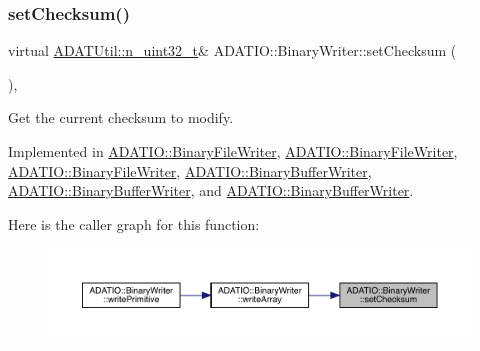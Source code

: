 \mbox{\label{classADATIO_1_1BinaryWriter_ae64230370824192d1f0dbcaa8e74017a}} 
\subsubsection{\texorpdfstring{setChecksum()}{setChecksum()}\hspace{0.1cm}{\footnotesize\ttfamily [1/3]}}
{\footnotesize\ttfamily virtual \mbox{\hyperlink{namespaceADATUtil_ad945a8afa4db2d1f89b731964adae97e}{A\+D\+A\+T\+Util\+::n\+\_\+uint32\+\_\+t}}\& A\+D\+A\+T\+I\+O\+::\+Binary\+Writer\+::set\+Checksum (\begin{DoxyParamCaption}{ }\end{DoxyParamCaption})\hspace{0.3cm}{\ttfamily [protected]}, {}}



Get the current checksum to modify. 



Implemented in \mbox{\hyperlink{classADATIO_1_1BinaryFileWriter_a0137ec5926d08e49ed7a63c6ef33e882}{A\+D\+A\+T\+I\+O\+::\+Binary\+File\+Writer}}, \mbox{\hyperlink{classADATIO_1_1BinaryFileWriter_a0137ec5926d08e49ed7a63c6ef33e882}{A\+D\+A\+T\+I\+O\+::\+Binary\+File\+Writer}}, \mbox{\hyperlink{classADATIO_1_1BinaryFileWriter_a0137ec5926d08e49ed7a63c6ef33e882}{A\+D\+A\+T\+I\+O\+::\+Binary\+File\+Writer}}, \mbox{\hyperlink{classADATIO_1_1BinaryBufferWriter_af4cc523a862ce29a96f1a813f254360e}{A\+D\+A\+T\+I\+O\+::\+Binary\+Buffer\+Writer}}, \mbox{\hyperlink{classADATIO_1_1BinaryBufferWriter_af4cc523a862ce29a96f1a813f254360e}{A\+D\+A\+T\+I\+O\+::\+Binary\+Buffer\+Writer}}, and \mbox{\hyperlink{classADATIO_1_1BinaryBufferWriter_af4cc523a862ce29a96f1a813f254360e}{A\+D\+A\+T\+I\+O\+::\+Binary\+Buffer\+Writer}}.

Here is the caller graph for this function\+:
\nopagebreak
\begin{figure}[H]
\begin{center}
\leavevmode
\includegraphics[width=350pt]{db/dee/classADATIO_1_1BinaryWriter_ae64230370824192d1f0dbcaa8e74017a_icgraph}
\end{center}
\end{figure}
\mbox{\label{classADATIO_1_1BinaryWriter_ae64230370824192d1f0dbcaa8e74017a}} 

